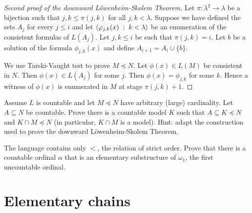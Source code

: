 \begin{proof}[Second proof of the downward L\"owenheim-Skolem Theorem]
  Let $\pi:\lambda^2\to\lambda$ be a bijection such that $j,k\le\pi(j,k)$ for all $j,k<\lambda$.
  Suppose we have defined the sets $A_j$ for every $j\le i$ and let $\langle\varphi_{j,k}(x)\;:\;k<\lambda\rangle$ be an enumeration of the consistent formulas of $L(A_j)$.
  Let $j,k\le i$ be such that $\pi(j,k)=i$.
  Let $b$ be a solution of the formula $\phi_{j,k}(x)$ and define $A_{i+1}=A_i\cup\{b\}$.

  We use Tarski-Vaught test to prove $M\preceq N$.
  Let $\phi(x)\in L(M)$ be consistent in $N$.
  Then $\phi(x)\in L(A_j)$ for some $j$.
  Then $\phi(x)=\phi_{j,k}$ for some $k$.
  Hence a witness of $\phi(x)$ is enumerated in $M$ at stage $\pi(j,k)+1$.
\end{proof}


\begin{exercise}\label{ex_LS}
Assume $L$ is countable and let $M\preceq N$ have arbitrary (large) cardinality.
Let $A\subseteq N$ be countable.
Prove there is a countable model $K$ such that $A\subseteq K\preceq N$ and $K\cap M\preceq N$ (in particular, $K\cap M$ is a model).
Hint: adapt the construction used to prove the downward L\"owenheim-Skolem Theorem.
\end{exercise}

\begin{exercise}\label{ex_elem_sub_of_omega1}
  The language contains only $<$, the relation of strict order.
  Prove that there is a countable ordinal $\alpha$ that is an elementary substructure of $\omega_1$, the first uncountable ordinal.
\end{exercise}

\section{Elementary chains}

